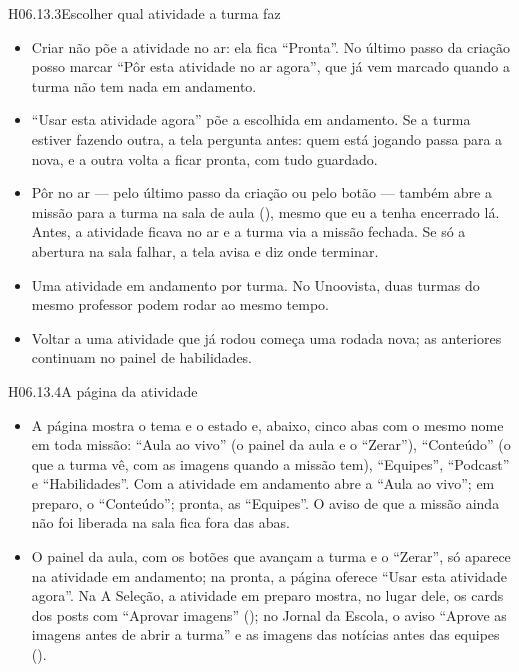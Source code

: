 \begin{historia}{H06.13.3}{Escolher qual atividade a turma faz}{\pronto}
\aceite
\begin{itemize}
  \item Criar não põe a atividade no ar: ela fica \enquote{Pronta}. No último
    passo da criação posso marcar \enquote{Pôr esta atividade no ar agora}, que
    já vem marcado quando a turma não tem nada em andamento.
  \item \enquote{Usar esta atividade agora} põe a escolhida em andamento. Se a
    turma estiver fazendo outra, a tela pergunta antes: quem está jogando passa
    para a nova, e a outra volta a ficar pronta, com tudo guardado.
  \item Pôr no ar --- pelo último passo da criação ou pelo botão --- também
    abre a missão para a turma na sala de aula (), mesmo que eu a
    tenha encerrado lá. Antes, a atividade ficava no ar e a turma via a missão
    fechada. Se só a abertura na sala falhar, a tela avisa e diz onde
    terminar.
  \item Uma atividade em andamento por turma. No Unoovista, duas turmas do
    mesmo professor podem rodar ao mesmo tempo.
  \item Voltar a uma atividade que já rodou começa uma rodada nova; as
    anteriores continuam no painel de habilidades.
\end{itemize}
\end{historia}

\begin{historia}{H06.13.4}{A página da atividade}{\pronto}
\aceite
\begin{itemize}
  \item A página mostra o tema e o estado e, abaixo, cinco abas com o mesmo
    nome em toda missão: \enquote{Aula ao vivo} (o painel da aula e o
    \enquote{Zerar}), \enquote{Conteúdo} (o que a turma vê, com as imagens
    quando a missão tem), \enquote{Equipes}, \enquote{Podcast} e
    \enquote{Habilidades}. Com a atividade em andamento abre a \enquote{Aula
    ao vivo}; em preparo, o \enquote{Conteúdo}; pronta, as \enquote{Equipes}.
    O aviso de que a missão ainda não foi liberada na sala fica fora das abas.
  \item O painel da aula, com os botões que avançam a turma e o
    \enquote{Zerar}, só aparece na atividade em andamento; na pronta, a página
    oferece \enquote{Usar esta atividade agora}. Na A Seleção, a atividade em
    preparo mostra, no lugar dele, os cards dos posts com \enquote{Aprovar
    imagens} (); no Jornal da Escola, o aviso \enquote{Aprove as
    imagens antes de abrir a turma} e as imagens das notícias antes das
    equipes ().
\end{itemize}
\end{historia}


